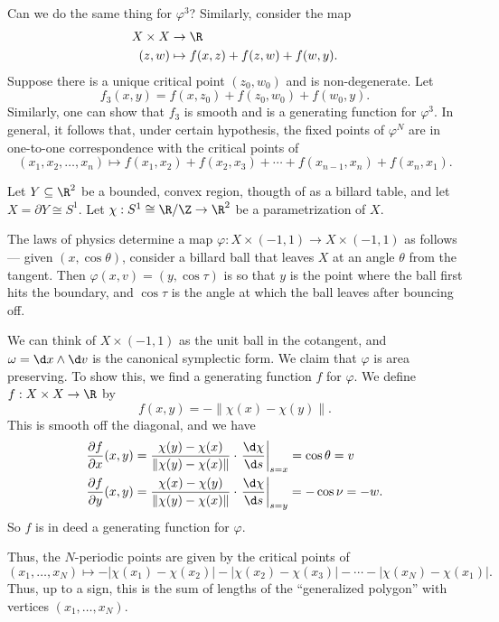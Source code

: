 \documentclass[a4paper]{article}
\begin{document}
Can we do the same thing for $\varphi^3$? Similarly, consider the map
\begin{align*}
  X \times X &\to \R\\
  (z, w) &\mapsto f(x, z) + f(z, w) + f(w, y).
\end{align*}
Suppose there is a unique critical point $(z_0, w_0)$ and is non-degenerate. Let
\[
  f_3(x, y) = f(x, z_0) + f(z_0, w_0) + f(w_0, y).
\]
Similarly, one can show that $f_3$ is smooth and is a generating function for $\varphi^3$. In general, it follows that, under certain hypothesis, the fixed points of $\varphi^N$ are in one-to-one correspondence with the critical points of
\[
  (x_1, x_2, \ldots, x_n) \mapsto f(x_1, x_2) + f(x_2, x_3) + \cdots + f(x_{n - 1}, x_n) + f(x_n, x_1).
\]
\begin{eg}
  Let $Y \subseteq \R^2$ be a bounded, convex region, thougth of as a billard table, and let $X = \partial Y \cong S^1$. Let $\chi: S^1 \cong \R/\Z \to \R^2$ be a parametrization of $X$.

  The laws of physics determine a map $\varphi: X \times (-1, 1) \to X \times (-1, 1)$ as follows --- given $(x, \cos \theta)$, consider a billard ball that leaves $X$ at an angle $\theta$ from the tangent. Then $\varphi(x, v) = (y, \cos \tau)$ is so that $y$ is the point where the ball first hits the boundary, and $\cos \tau$ is the angle at which the ball leaves after bouncing off.

  We can think of $X \times (-1, 1)$ as the unit ball in the cotangent, and $\omega = \d x \wedge \d v$ is the canonical symplectic form. We claim that $\varphi$ is area preserving. To show this, we find a generating function $f$ for $\varphi$. We define $f: X \times X \to \R$ by
  \[
    f(x, y) = - \|\chi(x) - \chi(y)\|.
  \]
  This is smooth off the diagonal, and we have
  \begin{align*}
    \frac{\partial f}{\partial x}(x, y) &= \frac{\chi(y) - \chi(x)}{\|\chi(y) - \chi(x)\|} \cdot \left. \frac{\d \chi}{\d s} \right|_{s = x} = \cos \theta = v\\
    \frac{\partial f}{\partial y}(x, y) &= \frac{\chi(x) - \chi(y)}{\|\chi(y) - \chi(x)\|} \cdot \left. \frac{\d \chi}{\d s} \right|_{s = y} = - \cos \nu = -w.
  \end{align*}
  So $f$ is in deed a generating function for $\varphi$.

  Thus, the $N$-periodic points are given by the critical points of
  \[
    (x_1, \ldots, x_N) \mapsto - |\chi(x_1) - \chi(x_2)| - |\chi(x_2) - \chi(x_3)| - \cdots - |\chi(x_N) - \chi(x_1)|.
  \]
  Thus, up to a sign, this is the sum of lengths of the ``generalized polygon'' with vertices $(x_1, \ldots, x_N)$.
\end{eg}
\end{document}
